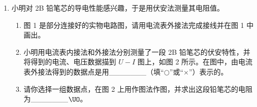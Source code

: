 \documentclass[\gkver]{gaokaozhenti}
\begin{document}
\begin{enumerate}
\begin{enumerate}
	\item
	某次测量如图 2 所示，指针示数为\_\_\_\_\_\_\_\_\_\_\_$\Ucm$。

	\item
	在弹性限度内，将 $50\Ug$ 的钩码逐个挂在弹簧下端，得到指针 A、B 的示数 $L_{\mathrm{A}}$ 和 $L_{\mathrm{B}}$ 如表 1。用表 1 数据计算弹簧 Ⅰ 的劲度系数为\_\_\_\_\_\_\_\_\_\_\_$\UNm$（重力加速度 $g=10\Umsq$）。由表 1 数据\_\_\_\_\_（填“能”或“不能”）计算出弹簧 Ⅱ 的劲度系数。
\end{enumerate}

{figs/21a.png}


\item
小明对 2B 铅笔芯的导电性能感兴趣，于是用伏安法测量其电阻值。

\begin{enumerate}
	\item
	图 1 是部分连接好的实物电路图，请用电流表外接法完成接线并在图 1 中画出。

	\item
	小明用电流表内接法和外接法分别测量了一段 2B 铅笔芯的伏安特性，并将得到的电流、电压数据描到 $U-I$ 图上，如图 2 所示。在图中，由电流表外接法得到的数据点是用\_\_\_\_\_\_\_（填“$\bigcirc$”或“$\times$”）表示的。

	\item
	请你选择一组数据点，在图 2 上用作图法作图，并求出这段铅笔芯的电阻为\_\_\_\_\_\_\_$\UO$。
\end{enumerate}


\end{enumerate}
\end{document}
